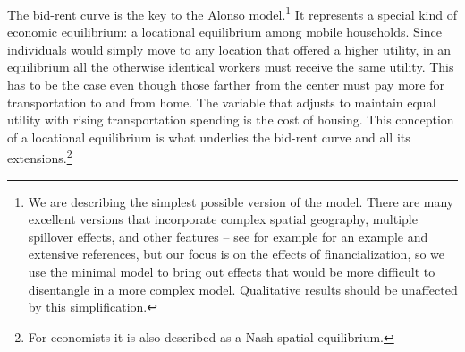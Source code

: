  The \gls{bid-rent curve} is the key to the Alonso model.\footnote{We are describing the simplest possible version of the model. There are many excellent versions that incorporate complex spatial geography, multiple spillover effects, and other features -- see for example \cite{ahlfeldt-ECONOMICSDENSITYEVIDENCE2015} for an example and extensive references, but our focus is on the effects of financialization, so we use the minimal model to bring out effects that would be more difficult to disentangle in a more complex model. Qualitative results should be unaffected by this simplification.}  It represents a special  kind of economic equilibrium:   a locational equilibrium among mobile households. Since individuals would simply move to any location that offered a higher utility, in an equilibrium all the otherwise identical workers must receive the same utility. This has to be the case even though those farther from the center must pay more for transportation to and from home. The variable that  adjusts to maintain equal utility with rising transportation spending is the cost of housing. This conception of a \gls{locational equilibrium} is what underlies the bid-rent curve and all its extensions.\footnote{For economists it is also described as a Nash spatial equilibrium.}








